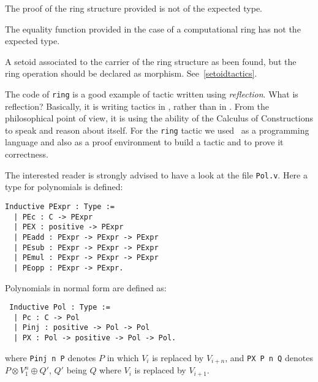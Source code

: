 \begin{ErrMsgs}
\item {}
  The proof of the ring structure provided is not of the expected type.
\item {}
  The equality function provided in the case of a computational ring
  has not the expected type.
\item {}
  A setoid associated to the carrier of the ring structure as been
  found, but the ring operation should be declared as
  morphism. See~\ref{setoidtactics}.
\end{ErrMsgs}


The code of \texttt{ring} is a good example of tactic written using
\textit{reflection}.  What is reflection? Basically, it is writing
\Coq{} tactics in \Coq, rather than in \ocaml. From the philosophical
point of view, it is using the ability of the Calculus of
Constructions to speak and reason about itself.  For the \texttt{ring}
tactic we used \Coq\ as a programming language and also as a proof
environment to build a tactic and to prove it correctness.

The interested reader is strongly advised to have a look at the file
\texttt{Pol.v}. Here a type for polynomials is defined: 

\begin{small}
\begin{flushleft}
\begin{verbatim}
Inductive PExpr : Type :=
  | PEc : C -> PExpr
  | PEX : positive -> PExpr
  | PEadd : PExpr -> PExpr -> PExpr
  | PEsub : PExpr -> PExpr -> PExpr
  | PEmul : PExpr -> PExpr -> PExpr
  | PEopp : PExpr -> PExpr.
\end{verbatim}
\end{flushleft}
\end{small}

Polynomials in normal form are defined as:
\begin{small}
\begin{flushleft}
\begin{verbatim}
 Inductive Pol : Type :=
  | Pc : C -> Pol 
  | Pinj : positive -> Pol -> Pol                   
  | PX : Pol -> positive -> Pol -> Pol.
\end{verbatim}
\end{flushleft}
\end{small}
where {\tt Pinj n P} denotes $P$ in which $V_i$ is replaced by
$V_{i+n}$, and {\tt PX P n Q} denotes $P \otimes V_1^{n} \oplus Q'$,
$Q'$ being $Q$ where $V_i$ is replaced by $V_{i+1}$. 


